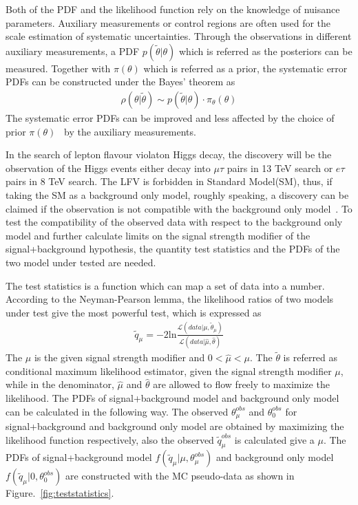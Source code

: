 Both of the PDF and the likelihood function rely on the knowledge of nuisance parameters. Auxiliary measurements or control regions are often used for the scale estimation of systematic uncertainties. Through the observations in different auxiliary measurements, a PDF $p(\tilde{\theta}|\theta)$ which is referred as the posteriors can be measured. Together with $\pi(\theta)$ which is referred as a prior, the systematic error PDFs can be constructed under the Bayes' theorem as
\begin{align*}
\rho(\theta|\tilde{\theta})\sim p(\tilde{\theta}|\theta)\cdot \pi_{\theta}(\theta)
\end{align*}
The systematic error PDFs can be improved and less affected by the choice of prior $\pi(\theta)$~\cite{statistics:school2016} by the auxiliary measurements. 

In the search of lepton flavour violaton Higgs decay, the discovery will be the observation of the Higgs events either decay into $\mu\tau$ pairs in 13 TeV search or $e\tau$ pairs in 8 TeV search. The LFV is forbidden in Standard Model(SM), thus, if taking the SM as a background only model, roughly speaking, a discovery can be claimed if the observation is not compatible with the background only model~\cite{LHCstaticstics}. To test the compatibility of the observed data with respect to the background only model and further calculate limits on the signal strength modifier of the signal+background hypothesis, the quantity test statistics and the PDFs of the two model under tested are needed.

The test statistics is a function which can map a set of data into a number. According to the Neyman-Pearson lemma, the likelihood ratios of two models under test give the most powerful test, which is expressed as
\begin{align*}
\tilde{q}_{\mu}=-2\textrm{ln}\frac{\mathcal{L}(data|\mu,\tilde{\theta}_{\mu})}{\mathcal{L}(data|\hat{\mu},\hat{\theta})}
\end{align*}
The $\mu$ is the given signal strength modifier and $0<\hat{\mu}<\mu$. The $\tilde{\theta}$ is referred as conditional maximum likelihood estimator, given the signal strength modifier $\mu$, while in the denominator, $\hat{\mu}$ and $\hat{\theta}$ are allowed to flow freely to maximize the likelihood. The PDFs of signal+background model and background only model can be calculated in the following way. The observed $\theta^{obs}_{\mu}$ and  $\theta^{obs}_{0}$ for signal+background and background only model are obtained by maximizing the likelihood function respectively, also the observed $\tilde{q}_{\mu}^{obs}$ is calculated give a $\mu$. The PDFs of signal+background model $f(\tilde{q}_{\mu}|\mu,\theta^{obs}_{\mu})$ and background only model $f(\tilde{q}_{\mu}|0,\theta^{obs}_{0})$ are constructed with the MC pseudo-data as shown in Figure.~\ref{fig:teststatistics}.

